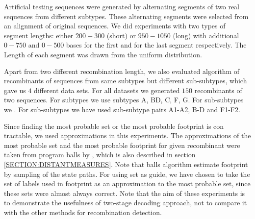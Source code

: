 Artificial testing sequences were generated by alternating segments of two real
sequences from different subtypes.  These alternating segments were selected
from an alignment of original sequences. We did experiments with two types of
segment lengths: either $200-300$ (short) or $950-1050$ (long) with additional
$0-750$ and $0-500$ bases for the first and for the last segment respectively.
The Length of each segment was drawn from the uniform distribution.

Apart from two different recombination length, we also evaluated algorithm of
recombinants of sequences from same subtypes but different sub-subtypes, which
gave us $4$ different data sets. For all datasets we generated $150$
recombinants of two sequences. For subtypes we use subtypes A, BD, C, F, G. For
sub-subtypes we . For sub-subtypes we have used sub-subtype pairs A1-A2, B-D and
F1-F2.

Since finding the most probable set or the most probable footprint is con
tractable, we used approximations in this experiments. The approximations of the
most probable set and the most probable footprint for given recombinant were
taken from program balls by \cite{Brown2010}, which is also described in section
\ref{SECTION:DISTANTMEASURES}. Note that balls algorithm estimate footprint by
sampling of the state paths. For using set as guide, we have chosen to take the
set of labels used in footprint as an approximation to the most probable set,
since these sets were almost always correct. Note that the aim of these
experiments is to demonstrate the usefulness of two-stage decoding approach, not
to compare it with the other methods for recombination detection.

